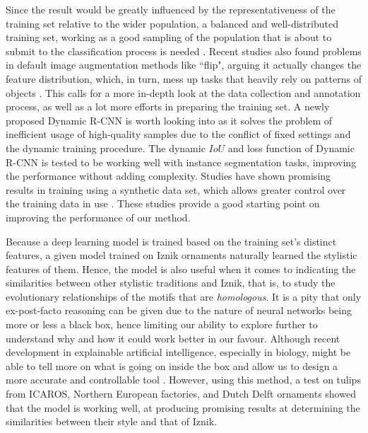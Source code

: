 \documentclass[11pt]{article}
\begin{document}
Since the result would be greatly influenced by the representativeness of the training set relative to the wider population, a balanced and well-distributed training set, working as a good sampling of the population that is about to submit to the classification process is needed \parencite{yang2010testing}. Recent studies also found problems in default image augmentation methods like ``flip", arguing it actually changes the feature distribution, which, in turn, mess up tasks that heavily rely on patterns of objects \parencite{lin2020visual}. This calls for a more in-depth look at the data collection and annotation process, as well as a lot more efforts in preparing the training set. A newly proposed Dynamic R-CNN \parencite{zhang2020dynamic} is worth looking  into as it solves the problem of inefficient usage of high-quality samples due to the conflict of fixed settings and the dynamic training procedure. The dynamic $IoU$ and loss function of Dynamic R-CNN is tested to be working well with instance segmentation tasks, improving the performance without adding complexity. Studies have shown promising results in training using a synthetic data set, which allows greater control over the training data in use \parencite{varga2003generation, allken2019fish}. These studies provide a good starting point on improving the performance of our method.\par
Because a deep learning model is trained based on the training set's distinct features, a given model trained on Iznik ornaments naturally learned the stylistic features of them. Hence, the model is also useful when it comes to indicating the similarities between other stylistic traditions and Iznik, that is, to study the evolutionary relationships of the motifs that are \emph{homologous}. It is a pity that only ex-post-facto reasoning can be given due to the nature of neural networks being more or less a black box, hence limiting our ability to explore further to understand why and how it could work better in our favour. Although recent development in explainable artificial intelligence, especially in biology, might be able to tell more on what is going on inside the box and allow us to design a more accurate and controllable tool \parencite{samek2017explainable, ghosal2018explainable}. However, using this method, a test on tulips from ICAROS, Northern European factories, and Dutch Delft ornaments showed that the model is working well, at producing promising results at determining the similarities between their style and that of Iznik. \par
\end{document}
